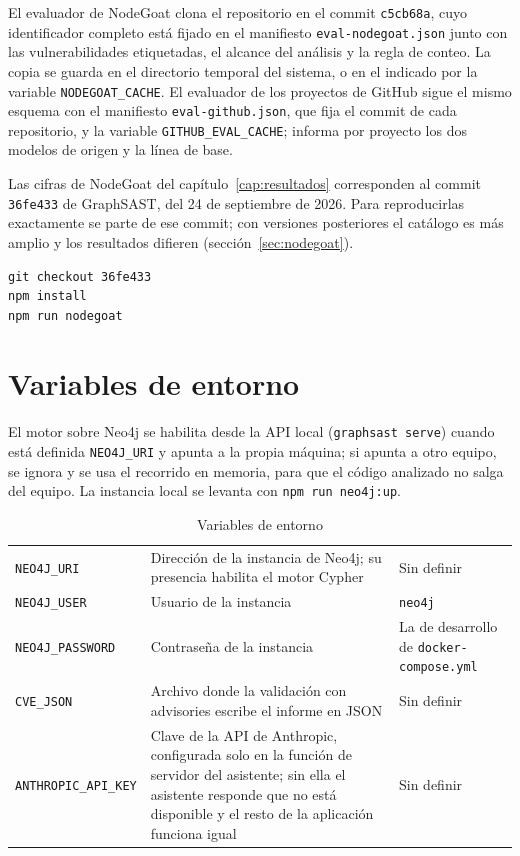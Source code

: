 El evaluador de NodeGoat clona el repositorio en el commit
\texttt{c5cb68a}, cuyo identificador completo está fijado en el
manifiesto \texttt{eval-nodegoat.json} junto con las vulnerabilidades
etiquetadas, el alcance del análisis y la regla de conteo. La copia se
guarda en el directorio temporal del sistema, o en el indicado por la
variable \texttt{NODEGOAT\_CACHE}. El evaluador de los proyectos de
GitHub sigue el mismo esquema con el manifiesto \texttt{eval-github.json},
que fija el commit de cada repositorio, y la variable
\texttt{GITHUB\_EVAL\_CACHE}; informa por proyecto los dos modelos de
origen y la línea de base.

Las cifras de NodeGoat del capítulo~\ref{cap:resultados} corresponden al
commit \texttt{36fe433} de GraphSAST, del 24 de septiembre de 2026. Para
reproducirlas exactamente se parte de ese commit; con versiones
posteriores el catálogo es más amplio y los resultados difieren
(sección~\ref{sec:nodegoat}).

\begin{lstlisting}[caption={Reproducción de NodeGoat con la versión medida}, label={lst:nodegoat-version}]
git checkout 36fe433
npm install
npm run nodegoat
\end{lstlisting}

\section{Variables de entorno}

El motor sobre Neo4j se habilita desde la API local
(\texttt{graphsast serve}) cuando está definida \texttt{NEO4J\_URI} y
apunta a la propia máquina; si apunta a otro equipo, se ignora y se usa
el recorrido en memoria, para que el código analizado no salga del
equipo. La instancia local se levanta con \texttt{npm run neo4j:up}.

\begin{table}[H]
    \centering
    \caption{Variables de entorno}
    \label{tab:variables-entorno}
    \small
    \begin{tabularx}{\textwidth}{l L l}
        \toprule
         &  &  \\
        \midrule
        \texttt{NEO4J\_URI} & Dirección de la instancia de Neo4j; su presencia habilita el motor Cypher & Sin definir \\
        \texttt{NEO4J\_USER} & Usuario de la instancia & \texttt{neo4j} \\
        \texttt{NEO4J\_PASSWORD} & Contraseña de la instancia & La de desarrollo de \texttt{docker-compose.yml} \\
        \texttt{CVE\_JSON} & Archivo donde la validación con advisories escribe el informe en JSON & Sin definir \\
        \texttt{ANTHROPIC\_API\_KEY} & Clave de la API de Anthropic, configurada solo en la función de servidor del asistente; sin ella el asistente responde que no está disponible y el resto de la aplicación funciona igual & Sin definir \\
        \bottomrule
    \end{tabularx}
\end{table}
